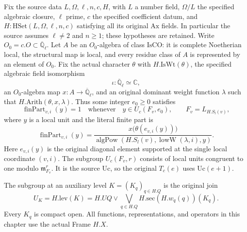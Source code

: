 \documentclass[11pt,a4paper]{article}
\numberwithin{equation}{section}
\theoremstyle{remark}\newtheorem{remark}[theorem]{Remark}
\begin{document}
Fix the source data $L,\mathcal\Omega,\ell,\allowbreak{} n,\allowbreak{} c,\allowbreak{} H$, with
$L$ a number field, $\mathcal\Omega/L$ the specified algebraic
closure, $\ell$ prime, $c$ the specified coefficient datum,
and $H:\mathrm{HSet}(L,\mathcal\Omega,\ell,\allowbreak{} n,\allowbreak{} c)$ satisfying
all its original $\mathrm{Ax}$ fields.  In particular the
source assumes $\ell\ne2$ and $n\geq1$; these hypotheses
are retained.  Write $O_0=c.O\subset\overline{\mathbb Q}_\ell$.
Let $A$ be an $O_0$-algebra of class $\mathrm{IsCO}$:
it is complete Noetherian local, the structural map is local,
and every residue class of $A$ is represented by an element
of $O_0$.  Fix the actual character $\theta$ with
$H.\mathrm{IsWt}(\theta)$, the specified algebraic field
isomorphism
\[
             \iota:\overline{\mathbb Q}_\ell\simeq\mathbb C,
\]
an $O_0$-algebra map $x:A\to\overline{\mathbb Q}_\ell$,
and an original dominant weight function $\lambda$ such that
$H.\mathrm{Arith}(\theta,\allowbreak{} x,\lambda)$.
Thus some integer $e_0\geq0$ satisfies
\begin{equation}\label{eq:asp-arithmetic}
 \operatorname{finPart}_{v,\allowbreak{} i}(y)=1
 \quad\text{whenever}\quad y\in U_c(F_v,\allowbreak{} e_0),
 \qquad F_v=L_{H.S_l(v)},
\end{equation}
where $y$ is a local unit and the literal finite part is
\begin{equation}\label{eq:asp-finpart}
 \operatorname{finPart}_{v,\allowbreak{} i}(y)=
       \frac{x\bigl(\theta(e_{v,\allowbreak{} i}(y))\bigr)}
       {\operatorname{algPow}(H.S_l(v),
                                   \operatorname{lowW}(\lambda,\allowbreak{} i),\allowbreak{} y)}.
\end{equation}
Here $e_{v,\allowbreak{} i}(y)$ is the original diagonal element supported
at the single local coordinate $(v,\allowbreak{} i)$.  The subgroup
$U_c(F_v,\allowbreak{} r)$ consists of local units congruent to one
modulo $\mathfrak m_{F_v}^r$.  It is the source $\mathrm{Uc}$,
so the original $T_c(e)$ uses $\mathrm{Uc}(e+1)$.

The subgroup at an auxiliary level $K=(K_q)_{q\in H.Q}$
is the original join
\begin{equation}\label{eq:asp-level}
       U_K=H.\mathrm{lev}(K)
          =H.UQ\vee\bigvee_{q\in H.Q}
                            H.\mathrm{sec}(H.w_q(q))(K_q).
\end{equation}
Every $K_q$ is compact open.  All functions, representations,
and operators in this chapter use the actual Frame $H.X$.
\end{document}

